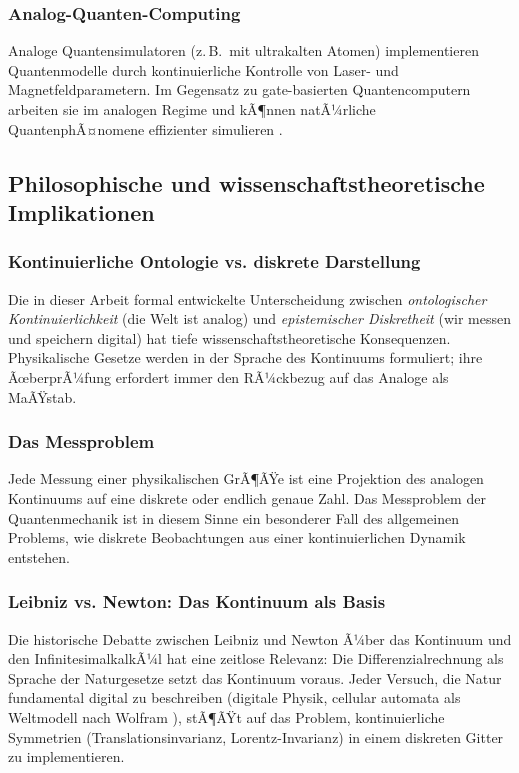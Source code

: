 ﻿\documentclass[a4paper,12pt]{article}
\theoremstyle{definition}
\begin{document}
\subsubsection{Analog-Quanten-Computing}

Analoge Quantensimulatoren (z.\,B.\ mit ultrakalten Atomen) implementieren
Quantenmodelle durch kontinuierliche Kontrolle von Laser- und Magnetfeldparametern.
Im Gegensatz zu gate-basierten Quantencomputern arbeiten sie im analogen Regime
und kÃ¶nnen natÃ¼rliche QuantenphÃ¤nomene effizienter simulieren \citep{Bloch2012}.

\subsection{Philosophische und wissenschaftstheoretische Implikationen}

\subsubsection{Kontinuierliche Ontologie vs. diskrete Darstellung}

Die in dieser Arbeit formal entwickelte Unterscheidung zwischen
\emph{ontologischer Kontinuierlichkeit} (die Welt ist analog) und
\emph{epistemischer Diskretheit} (wir messen und speichern digital) hat
tiefe wissenschaftstheoretische Konsequenzen.  Physikalische Gesetze werden
in der Sprache des Kontinuums formuliert; ihre ÃœberprÃ¼fung erfordert immer
den RÃ¼ckbezug auf das Analoge als MaÃŸstab.

\subsubsection{Das Messproblem}

Jede Messung einer physikalischen GrÃ¶ÃŸe ist eine Projektion des
analogen Kontinuums auf eine diskrete oder endlich genaue Zahl.
Das Messproblem der Quantenmechanik ist in diesem Sinne ein besonderer Fall
des allgemeinen Problems, wie diskrete Beobachtungen aus einer kontinuierlichen
Dynamik entstehen.

\subsubsection{Leibniz vs. Newton: Das Kontinuum als Basis}

Die historische Debatte zwischen Leibniz und Newton Ã¼ber das Kontinuum und den
InfinitesimalkalkÃ¼l \citep{Leibniz1684} hat eine zeitlose Relevanz:
Die Differenzialrechnung als Sprache der Naturgesetze setzt das Kontinuum voraus.
Jeder Versuch, die Natur fundamental digital zu beschreiben (digitale Physik,
cellular automata als Weltmodell nach Wolfram \citep{Wolfram2002}), stÃ¶ÃŸt auf
das Problem, kontinuierliche Symmetrien (Translationsinvarianz, Lorentz-Invarianz)
in einem diskreten Gitter zu implementieren.
\end{document}

